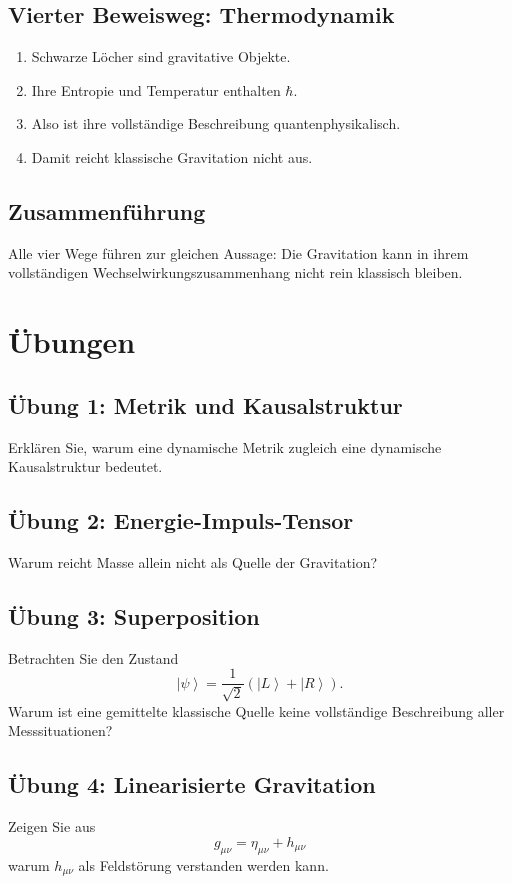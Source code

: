 \documentclass[11pt,a4paper,oneside]{book}
\theoremstyle{definition}
\theoremstyle{plain}
\theoremstyle{remark}
\newcommand{\ket}[1]{\left|#1\right\rangle}
\begin{document}
\section{Vierter Beweisweg: Thermodynamik}
\begin{enumerate}[label=\arabic*.]
\item Schwarze Löcher sind gravitative Objekte.
\item Ihre Entropie und Temperatur enthalten $\hbar$.
\item Also ist ihre vollständige Beschreibung quantenphysikalisch.
\item Damit reicht klassische Gravitation nicht aus.
\end{enumerate}

\section{Zusammenführung}
Alle vier Wege führen zur gleichen Aussage: Die Gravitation kann in ihrem vollständigen Wechselwirkungszusammenhang nicht rein klassisch bleiben.

\chapter{Übungen}
\section*{Übung 1: Metrik und Kausalstruktur}
Erklären Sie, warum eine dynamische Metrik zugleich eine dynamische Kausalstruktur bedeutet.

\section*{Übung 2: Energie-Impuls-Tensor}
Warum reicht Masse allein nicht als Quelle der Gravitation?

\section*{Übung 3: Superposition}
Betrachten Sie den Zustand
\[
\ket{\psi}=\frac{1}{\sqrt2}(\ket{L}+\ket{R}).
\]
Warum ist eine gemittelte klassische Quelle keine vollständige Beschreibung aller Messsituationen?

\section*{Übung 4: Linearisierte Gravitation}
Zeigen Sie aus
\[
g_{\mu\nu}=\eta_{\mu\nu}+h_{\mu\nu}
\]
warum $h_{\mu\nu}$ als Feldstörung verstanden werden kann.
\end{document}
